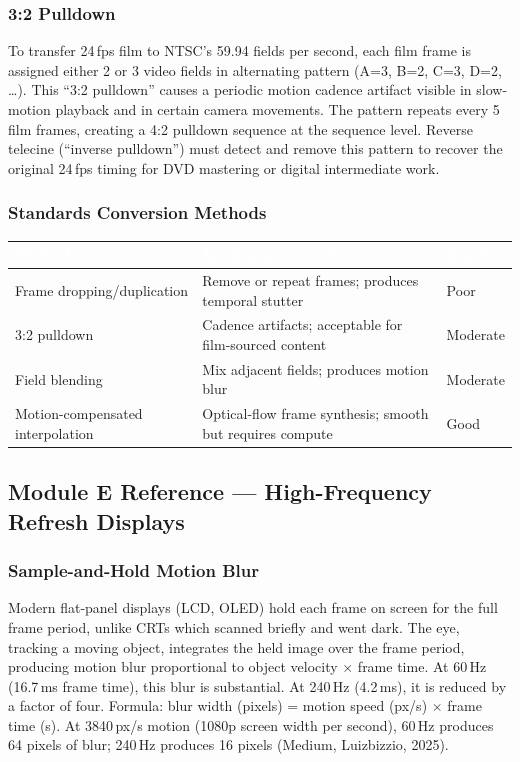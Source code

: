 \documentclass[11pt,letterpaper]{article}
\newcommand{\tableheader}[1]{\textbf{\sffamily\textcolor{white}{#1}}}
\begin{document}
\subsubsection{3:2 Pulldown}

To transfer 24\,fps film to NTSC's 59.94 fields per second, each film frame is assigned either
2 or 3 video fields in alternating pattern (A=3, B=2, C=3, D=2, \ldots). This ``3:2 pulldown'' causes
a periodic motion cadence artifact visible in slow-motion playback and in certain camera movements.
The pattern repeats every 5 film frames, creating a 4:2 pulldown sequence at the sequence level.
Reverse telecine (``inverse pulldown'') must detect and remove this pattern to recover the original
24\,fps timing for DVD mastering or digital intermediate work.

\subsubsection{Standards Conversion Methods}

\begin{center}
\begin{tabularx}{\textwidth}{L{3.5cm}XC{2cm}}
\toprule
{}
\tableheader{Method} & \tableheader{Mechanism / Artifacts} & \tableheader{Quality} \\
\midrule
Frame dropping/duplication & Remove or repeat frames; produces temporal stutter & Poor \\
3:2 pulldown & Cadence artifacts; acceptable for film-sourced content & Moderate \\
Field blending & Mix adjacent fields; produces motion blur & Moderate \\
Motion-compensated interpolation & Optical-flow frame synthesis; smooth but requires compute & Good \\
\bottomrule
\end{tabularx}
\end{center}

\subsection{Module E Reference --- High-Frequency Refresh Displays}

\subsubsection{Sample-and-Hold Motion Blur}

Modern flat-panel displays (LCD, OLED) hold each frame on screen for the full frame period, unlike
CRTs which scanned briefly and went dark. The eye, tracking a moving object, integrates the held
image over the frame period, producing motion blur proportional to object velocity $\times$ frame
time. At 60\,Hz (16.7\,ms frame time), this blur is substantial. At 240\,Hz (4.2\,ms), it is
reduced by a factor of four. Formula: blur width (pixels) = motion speed (px/s) $\times$ frame
time (s). At 3840\,px/s motion (1080p screen width per second), 60\,Hz produces 64 pixels of blur;
240\,Hz produces 16 pixels (Medium, Luizbizzio, 2025).
\end{document}
